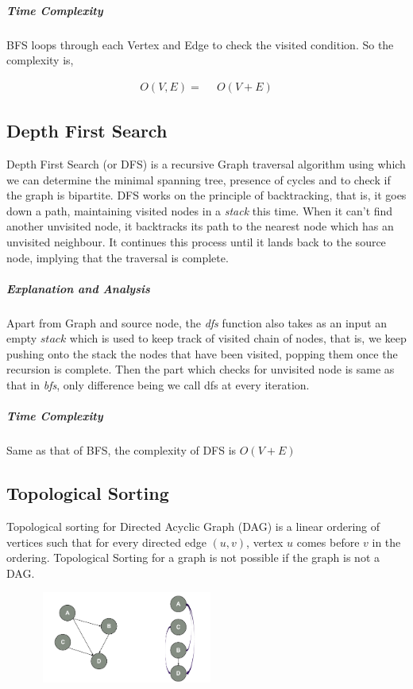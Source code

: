 \documentclass[11pt,a4paper]{extarticle}
\begin{document}
\subparagraph{Time Complexity}
BFS loops through each Vertex and Edge to check the visited condition. So the complexity is,

\begin{align}
O(V,E) =& \,\,\,O(V+E)
\end{align}

\subsection{Depth First Search}

Depth First Search (or DFS) is a recursive Graph traversal algorithm using which we can determine the minimal spanning tree, presence of cycles and to check if the graph is bipartite. DFS works on the principle of backtracking, that is, it goes down a path, maintaining visited nodes in a \textit{stack} this time. When it can't find another unvisited node, it backtracks its path to the nearest node which has an unvisited neighbour. It continues this process until it lands back to the source node, implying that the traversal is complete.


\begin{adjustwidth}{2.5em}{0pt}

\end{adjustwidth}

\subparagraph{Explanation and Analysis}
Apart from Graph and source node, the \textit{dfs} function also takes as an input an empty $stack$ which is used to keep track of visited chain of nodes, that is, we keep pushing onto the stack the nodes that have been visited, popping them once the recursion is complete. Then the part which checks for unvisited node is same as that in \textit{bfs}, only difference being we call dfs at every iteration.

\subparagraph{Time Complexity}
Same as that of BFS, the complexity of DFS is $O(V+E)$

\subsection{Topological Sorting}
Topological sorting for Directed Acyclic Graph (DAG) is a linear ordering of vertices such that for every directed edge $(u,v)$, vertex $u$ comes before $v$ in the ordering. Topological Sorting for a graph is not possible if the graph is not a DAG.

\begin{center}
	\includegraphics[width=8cm, height=3cm]{topological}
\end{center}
\end{document}
